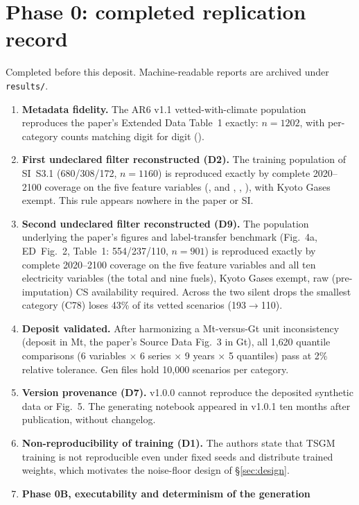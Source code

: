 \documentclass[11pt,a4paper]{article}
\newcommand{\prop}[1]{#1}
\newcommand{\prop}[1]{\textcolor{blue}{#1}}
\begin{document}
\section{Phase 0: completed replication record}\label{sec:phase0}
Completed before this deposit. Machine-readable reports are archived under
\texttt{results/}.
\begin{enumerate}[nosep]
\item \textbf{Metadata fidelity.} The AR6 v1.1 vetted-with-climate
  population reproduces the paper's Extended Data Table~1 exactly: $n=1202$,
  with per-category counts matching digit for digit
  ().
\item \textbf{First undeclared filter reconstructed (D2).} The training
  population of SI~S3.1 (680/308/172, $n=1160$) is reproduced exactly by
  complete 2020--2100 coverage on the five feature variables
  (,  and ,
  , ), with Kyoto
  Gases exempt. This rule appears nowhere in the paper or SI.
\item \textbf{Second undeclared filter reconstructed (D9).} The population
  underlying the paper's figures and label-transfer benchmark (Fig.~4a,
  ED~Fig.~2, Table~1: 554/237/110, $n=901$) is reproduced exactly by
  complete 2020--2100 coverage on the five feature variables and all ten
  electricity variables \prop{(the total and nine fuels)}, Kyoto Gases exempt, raw
  (pre-imputation) CS availability required. Across the two silent drops
  the smallest category (C78) loses 43\% of its vetted scenarios
  (193$\to$110).
\item \textbf{Deposit validated.} After harmonizing a Mt-versus-Gt unit
  inconsistency (deposit in Mt, the paper's Source Data Fig.~3 in Gt), all
  1{,}620 quantile comparisons (6 variables $\times$ 6 series $\times$ 9
  years $\times$ 5 quantiles) pass at 2\% relative tolerance. Gen files
  hold 10{,}000 scenarios per category.
\item \textbf{Version provenance (D7).} v1.0.0 cannot reproduce the
  deposited synthetic data or Fig.~5. The generating notebook appeared in
  v1.0.1 ten months after publication, without changelog.
\item \textbf{Non-reproducibility of training (D1).} The authors state that
  TSGM training is not reproducible even under fixed seeds and distribute
  trained weights, which motivates the noise-floor design of
  \S\ref{sec:design}.
\item \textbf{Phase 0B, executability and determinism of the generation
}
\end{enumerate}
\end{document}
